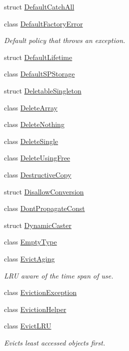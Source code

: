 \begin{DoxyCompactItemize}
struct \hyperlink{structLoki_1_1DefaultCatchAll}{Default\+Catch\+All}
\item 
class \hyperlink{structLoki_1_1DefaultFactoryError}{Default\+Factory\+Error}
\begin{DoxyCompactList}\small\item\em Default policy that throws an exception. \end{DoxyCompactList}\item 
struct \hyperlink{structLoki_1_1DefaultLifetime}{Default\+Lifetime}
\item 
class \hyperlink{classLoki_1_1DefaultSPStorage}{Default\+S\+P\+Storage}
\item 
struct \hyperlink{classLoki_1_1DeletableSingleton}{Deletable\+Singleton}
\item 
class \hyperlink{classLoki_1_1DeleteArray}{Delete\+Array}
\item 
class \hyperlink{classLoki_1_1DeleteNothing}{Delete\+Nothing}
\item 
class \hyperlink{classLoki_1_1DeleteSingle}{Delete\+Single}
\item 
class \hyperlink{classLoki_1_1DeleteUsingFree}{Delete\+Using\+Free}
\item 
class \hyperlink{classLoki_1_1DestructiveCopy}{Destructive\+Copy}
\item 
struct \hyperlink{structLoki_1_1DisallowConversion}{Disallow\+Conversion}
\item 
class \hyperlink{structLoki_1_1DontPropagateConst}{Dont\+Propagate\+Const}
\item 
struct \hyperlink{structLoki_1_1DynamicCaster}{Dynamic\+Caster}
\item 
class \hyperlink{classLoki_1_1EmptyType}{Empty\+Type}
\item 
class \hyperlink{classLoki_1_1EvictAging}{Evict\+Aging}
\begin{DoxyCompactList}\small\item\em L\+R\+U aware of the time span of use. \end{DoxyCompactList}\item 
class \hyperlink{classLoki_1_1EvictionException}{Eviction\+Exception}
\item 
class \hyperlink{classLoki_1_1EvictionHelper}{Eviction\+Helper}
\item 
class \hyperlink{classLoki_1_1EvictLRU}{Evict\+L\+R\+U}
\begin{DoxyCompactList}\small\item\em Evicts least accessed objects first. \end{DoxyCompactList}\item 

\end{DoxyCompactItemize}
